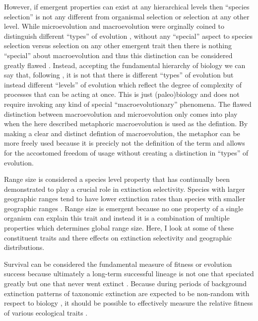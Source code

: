 \documentclass[12pt,letterpaper]{article}
\begin{document}
However, if emergent properties can exist at any hierarchical levels then ``species selection'' is not any different from organismal selection or selection at any other level. While microevolution and macroevolution were orginally coined to distinguish different ``types'' of evolution \citep{Goldschmidt1940}, without any ``special'' aspect to species selection versus selection on any other emergent trait then there is nothing ``special'' about macroevolution and thus this distinction can be considered greatly flawed \citep{Simpson1953}. Instead, accepting the fundamental hierarchy of biology \citep{Vrba1984} we can say that, following \citet{Simpson1953}, it is not that there is different ``types'' of evolution but instead different ``levels'' of evolution which reflect the degree of complexity of processes that can be acting at once. This is just (paleo)biology and does not require invoking any kind of special ``macroevolutionary'' phenomena. The flawed distinction between macroevolution and microevolution only comes into play when the here described metaphoric macroevolution is used as the defintion. By making a clear and distinct defintion of macroevolution, the metaphor can be more freely used because it is precicly not the definition of the term and allows for the accostomed freedom of usage without creating a distinction in ``types'' of evolution.

Range size is considered a species level property that has continually been demonstrated to play a crucial role in extinction selectivity. Species with larger geographic ranges tend to have lower extinction rates than species with smaller geographic ranges \citep{Jablonski1986,Harnik2013,Nurnberg2013a,Jablonski2003,Roy2009c}. Range size is emergent because no one property of a single organism can explain this trait and instead it is a combination of multiple properties which determines global range size. Here, I look at some of these constituent traits and there effects on extinction selectivity and geographic distributions.

Survival can be considered the fundamental measure of fitness or evolution success because ultimately a long-term successful lineage is not one that speciated greatly but one that never went extinct \citep{Cooper1984,Palmer2012}. Because during periods of background extinction patterns of taxonomic extinction are expected to be non-random with respect to biology \citep{Jablonski1986}, it should be possible to effectively measure the relative fitness of various ecological traits \citep{Kitchell1990,Kitchell1985a}. 
\end{document}
